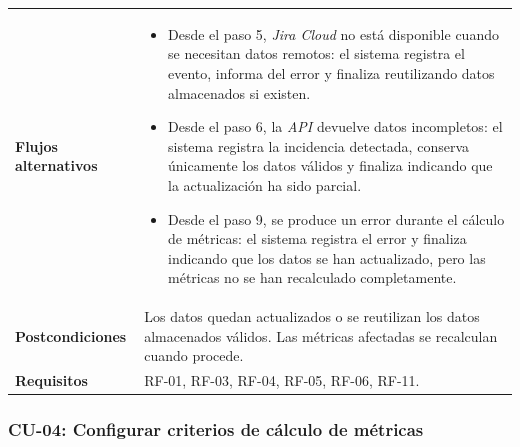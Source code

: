 {\begin{longtable}{p{3.2cm}p{10.2cm}}
\textbf{Flujos alternativos} & \begin{minipage}[t]{10.2cm}\begin{itemize}[noitemsep,leftmargin=*]
    \item Desde el paso 5, \textit{Jira Cloud} no está disponible cuando se necesitan datos remotos: el sistema registra el evento, informa del error y finaliza reutilizando datos almacenados si existen.
    \item Desde el paso 6, la \textit{API} devuelve datos incompletos: el sistema registra la incidencia detectada, conserva únicamente los datos válidos y finaliza indicando que la actualización ha sido parcial.
    \item Desde el paso 9, se produce un error durante el cálculo de métricas: el sistema registra el error y finaliza indicando que los datos se han actualizado, pero las métricas no se han recalculado completamente.
\end{itemize}\end{minipage} \\
\textbf{Postcondiciones} & Los datos quedan actualizados o se reutilizan los datos almacenados válidos. Las métricas afectadas se recalculan cuando procede. \\
\textbf{Requisitos} & RF-01, RF-03, RF-04, RF-05, RF-06, RF-11. \\
\bottomrule
\end{longtable}
\vspace{0.45em}
}


\clearpage
\subsubsection{CU-04: Configurar criterios de cálculo de métricas}

